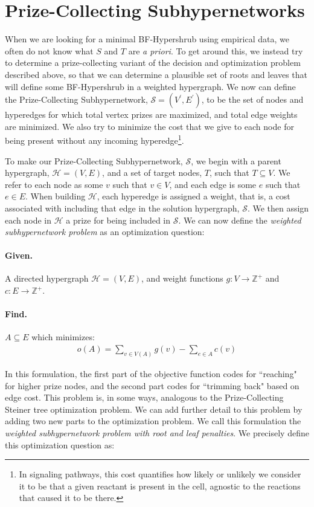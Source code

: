 \documentclass[12pt,twoside]{reedthesis}
\theoremstyle{definition}
\begin{document}
\section{Prize-Collecting Subhypernetworks}

When we are looking for a minimal BF-Hypershrub using empirical data, we often do not know what $S$ and $T$ are \textit{a priori}. To get around this, we instead try to determine a prize-collecting variant of the decision and optimization problem described above, so that we can determine a plausible set of roots and leaves that will define some BF-Hypershrub in a weighted hypergraph. We now can define the Prize-Collecting Subhypernetwork, $\mathcal{S} = (V^\prime,E^\prime)$, to be the set of nodes and hyperedges for which total vertex prizes are maximized, and total edge weights are minimized. We also try to minimize the cost that we give to each node for being present without any incoming hyperedge\footnote{In signaling pathways, this cost quantifies how likely or unlikely we consider it to be that a given reactant is present in the cell, agnostic to the reactions that caused it to be there.}.

To make our Prize-Collecting Subhypernetwork, $\mathcal{S}$, we begin with a parent hypergraph, $\mathcal{H} = (V,E)$, and a set of target nodes, $T$, such that $T \subseteq V$.  We refer to each node as some $v$ such that $v \in V$, and each edge is some $e$ such that $e \in E$.  When building $\mathcal{H}$, each hyperedge is assigned a weight, that is, a cost associated with including that edge in the solution hypergraph, $\mathcal{S}$.  We then assign each node in $\mathcal{H}$ a prize for being included in $\mathcal{S}$. We can now define the \textit{weighted subhypernetwork problem} as an optimization question:\par
\bigbreak

\hfill\begin{minipage}{\dimexpr\textwidth-2cm}
\paragraph{Given.}A directed hypergraph $\mathcal{H}=(V,E)$, and weight functions $g:V \rightarrow \mathbb{Z}^+$ and $c:E \rightarrow \mathbb{Z}^+$.
\paragraph{Find.}$A \subseteq E$ which minimizes:
\begin{align*}
  o(A) = \sum_{v \in V(A)}g(v) - \sum_{e \in A}c(v)
\end{align*}
\end{minipage}
\bigbreak
In this formulation, the first part of the objective function codes for ``reaching" for higher prize nodes, and the second part codes for ``trimming back" based on edge cost. This problem is, in some ways, analogous to the Prize-Collecting Steiner tree optimization problem. We can add further detail to this problem by adding two new parts to the optimization problem. We call this formulation the \textit{weighted subhypernetwork problem with root and leaf penalties}. We precisely define this optimization question as:\par
\bigbreak
\end{document}
